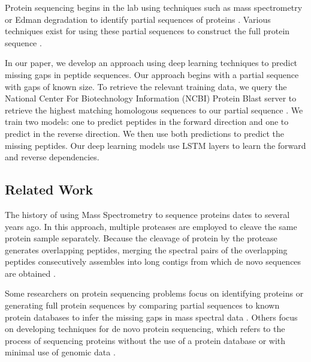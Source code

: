 \documentclass[journal]{IEEEtran}
\begin{document}
    Protein sequencing begins in the lab using techniques such as mass spectrometry or Edman degradation
    to identify partial sequences of proteins \cite{mann2016rise, edman1949method}. Various techniques exist for using these
    partial sequences to construct the full protein sequence
    \cite{standing2003peptide,perkins1999probability, eng1994approach, yang2021full}.

    In our paper, we develop an approach using deep learning techniques to predict missing gaps in peptide sequences.
    Our approach begins with a partial sequence with gaps of known size. To retrieve the relevant training data,
    we query the National Center For Biotechnology Information (NCBI) Protein Blast server to retrieve the highest matching
    homologous sequences to our partial sequence \cite{ncbi}. We train two models: one to predict peptides in the forward direction and one to predict in the reverse direction.
    We then use both predictions to predict the missing peptides. Our deep learning models use LSTM layers to learn the
    forward and reverse dependencies.

    \subsection{Related Work}

    The history of using Mass Spectrometry to sequence proteins dates to several years ago.
    In this approach, multiple proteases are employed to cleave the same protein sample separately.
    Because the cleavage of protein by the protease generates overlapping peptides, merging the spectral
    pairs of the overlapping peptides consecutively assembles into long contigs from which de novo
    sequences are obtained \cite{liu2014novo}.

    Some researchers on protein sequencing problems focus on identifying proteins or generating full protein sequences
    by comparing partial sequences to known protein databases to infer the missing gaps in mass spectral data
    \cite{eng1994approach, perkins1999probability}. Others focus on developing techniques for de novo protein sequencing,
    which refers to the process of sequencing proteins without the use of a protein database or with minimal use of
    genomic data \cite{standing2003peptide, bandeira2008automated}.
\end{document}
